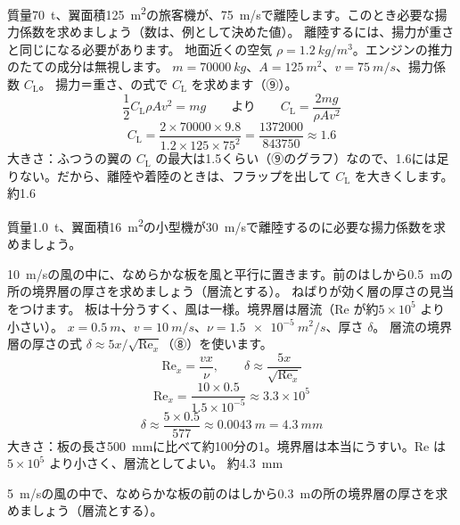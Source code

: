 \begin{phreidai}[旅客機が離陸するのに必要な揚力係数]\label{ph:力-15:ex9}
質量\qty{70}{t}、翼面積\qty{125}{m^2}の旅客機が、\qty{75}{m/s}で離陸します。このとき必要な揚力係数を求めましょう（数は、例として決めた値）。
\phbamen
離陸するには、揚力が重さと同じになる必要があります。
\phmushi
地面近くの空気 $\rho=\qty{1.2}{kg/m^3}$。エンジンの推力のたての成分は無視します。
\phzu
$m=\qty{70000}{kg}$、$A=\qty{125}{m^2}$、$v=\qty{75}{m/s}$、揚力係数 $C_{\mathrm L}$。
\phriyu
揚力＝重さ、の式で $C_{\mathrm L}$ を求めます（⑨）。
\phtateru
\[\frac{1}{2}C_{\mathrm L}\rho Av^2=mg\qquad\text{より}\qquad C_{\mathrm L}=\frac{2mg}{\rho Av^2}\]
\phtoku
\[C_{\mathrm L}=\frac{2\times\num{70000}\times9.8}{1.2\times125\times75^2}=\frac{\num{1372000}}{\num{843750}}\approx1.6\]
\phtashikame
大きさ：ふつうの翼の $C_{\mathrm L}$ の最大は1.5くらい（⑨のグラフ）なので、1.6には足りない。だから、離陸や着陸のときは、フラップを出して $C_{\mathrm L}$ を大きくします。
\kotae 約1.6
\end{phreidai}
\begin{jibun}
質量\qty{1.0}{t}、翼面積\qty{16}{m^2}の小型機が\qty{30}{m/s}で離陸するのに必要な揚力係数を求めましょう。
\end{jibun}

\begin{phreidai}[板の上の境界層の厚さ]\label{ph:力-15:ex10}
\qty{10}{m/s}の風の中に、なめらかな板を風と平行に置きます。前のはしから\qty{0.5}{m}の所の境界層の厚さを求めましょう（層流とする）。
\phbamen
ねばりが効く層の厚さの見当をつけます。
\phmushi
板は十分うすく、風は一様。境界層は層流（Re が約$5\times10^5$ より小さい）。
\phzu
$x=\qty{0.5}{m}$、$v=\qty{10}{m/s}$、$\nu=\qty{1.5e-5}{m^2/s}$、厚さ $\delta$。
\phriyu
層流の境界層の厚さの式 $\delta\approx5x/\sqrt{\mathrm{Re}_x}$（⑧）を使います。
\phtateru
\[\mathrm{Re}_x=\frac{vx}{\nu},\qquad\delta\approx\frac{5x}{\sqrt{\mathrm{Re}_x}}\]
\phtoku
\[\mathrm{Re}_x=\frac{10\times0.5}{1.5\times10^{-5}}\approx3.3\times10^5\]
\[\delta\approx\frac{5\times0.5}{577}\approx\qty{0.0043}{m}=\qty{4.3}{mm}\]
\phtashikame
大きさ：板の長さ\qty{500}{mm}に比べて約100分の1。境界層は本当にうすい。Re は$5\times10^5$ より小さく、層流としてよい。
\kotae 約\qty{4.3}{mm}
\end{phreidai}
\begin{jibun}
\qty{5}{m/s}の風の中で、なめらかな板の前のはしから\qty{0.3}{m}の所の境界層の厚さを求めましょう（層流とする）。
\end{jibun}

